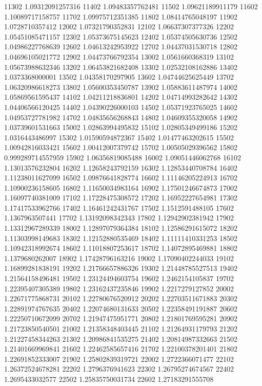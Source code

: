 {11302 1.09312091257316
11402 1.09483357762481
11502 1.09621189911179
11602 1.10089717158757
11702 1.09975712351385
11802 1.08414765048197
11902 1.0728710357412
12002 1.07321790352831
12102 1.06637307377326
12202 1.05451085471157
12302 1.05373675145623
12402 1.05374505630736
12502 1.04986227768639
12602 1.04613242953922
12702 1.04437031530718
12802 1.04696105021772
12902 1.04473766792354
13002 1.0561660368319
13102 1.05673988632346
13202 1.06453821682408
13302 1.02532108162886
13402 1.0373368000001
13502 1.04358170297905
13602 1.04744625625449
13702 1.06320986618273
13802 1.05600353450787
13902 1.05883611487974
14002 1.05869561595437
14102 1.04211218836801
14202 1.04714993282642
14302 1.04406566120425
14402 1.04390226000103
14502 1.05371923765025
14602 1.04953727781982
14702 1.04835656268843
14802 1.04609355320058
14902 1.03739601531663
15002 1.02863994495832
15102 1.02805349499186
15202 1.0316443486997
15302 1.01590594872367
15402 1.01477463202615
15502 1.00942816033421
15602 1.00412007379742
15702 1.00505029396562
15802 0.999289714557959
15902 1.06356819085488
16002 1.09051446062768
16102 1.13013576232804
16202 1.12658243792159
16302 1.12853440708784
16402 1.11238011627099
16502 1.09876641828774
16602 1.11146205224913
16702 1.10900236158605
16802 1.11650034983164
16902 1.17501246674873
17002 1.16097740381009
17102 1.17228475308572
17202 1.16952227654981
17302 1.17417533962766
17402 1.16461242431767
17502 1.1512591488105
17602 1.1367963507441
17702 1.13192098342343
17802 1.12942902381942
17902 1.13312967289339
18002 1.12897079364384
18102 1.12586291615072
18202 1.11303998149683
18302 1.12152880535469
18402 1.11111410331253
18502 1.10942318992674
18602 1.11018807253617
18702 1.14072895469881
18802 1.1379680262007
18902 1.17428796163216
19002 1.17090402244033
19102 1.16899281838191
19202 1.21766657886326
19302 1.21448785527513
19402 1.21564158496481
19502 1.23124494603754
19602 1.2462154105837
19702 1.22395407305389
19802 1.23162437235846
19902 1.2217279127852
20002 1.22671775868731
20102 1.22780676520912
20202 1.22703511671883
20302 1.22891974767635
20402 1.22074680131633
20502 1.22358491191887
20602 1.22250710672099
20702 1.21947475951771
20802 1.21801769595281
20902 1.21723850540501
21002 1.21358348403445
21102 1.21264931179793
21202 1.21227458344263
21302 1.20986841535275
21402 1.20814987332663
21502 1.21401669969841
21602 1.22462585657416
21702 1.22100378201401
21802 1.22691852333007
21902 1.25802839319721
22002 1.2722366071477
22102 1.26372524678281
22202 1.2796376941623
22302 1.26795274674567
22402 1.2695433032577
22502 1.25835750031734
22602 1.27183291555708
}
